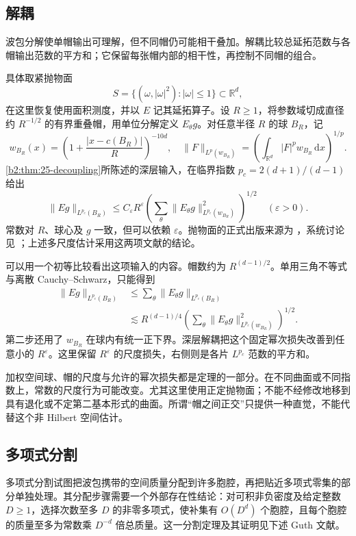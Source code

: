 \subsection{解耦}
\label{b2:subsec:230604}

波包分解使单帽输出可理解，但不同帽仍可能相干叠加。解耦比较总延拓范数与各帽输出范数的平方和；它保留每张帽内部的相干性，再控制不同帽的组合。

具体取紧抛物面
\[
 S=\{(\omega,|\omega|^2):|\omega|\leq1\}\subset\mathbb R^d,
\]
在这里恢复使用面积测度，并以 \(E\) 记其延拓算子。设 \(R\geq1\)，将参数域切成直径约 \(R^{-1/2}\) 的有界重叠帽，用单位分解定义 \(E_\theta g\)。对任意半径 \(R\) 的球 \(B_R\)，记
\[
 w_{B_R}(x)=\left(1+\frac{|x-c(B_R)|}{R}\right)^{-10d},\quad
 \|F\|_{L^p(w_{B_R})}
 =\left(\int_{\mathbb R^d}|F|^p w_{B_R}\,\mathrm dx\right)^{1/p}.
\]
\cref{b2:thm:25-decoupling}所陈述的深层输入，在临界指数 \(p_c=2(d+1)/(d-1)\) 给出
\[
 \|Eg\|_{L^{p_c}(B_R)}
 \leq C_\varepsilon R^\varepsilon
       \left(\sum_\theta
          \|E_\theta g\|_{L^{p_c}(w_{B_R})}^2
       \right)^{1/2}
 \quad(\varepsilon>0).
\]
常数对 \(R\)、球心及 \(g\) 一致，但可以依赖 \(\varepsilon\)。抛物面的正式出版来源为 \cite{BourgainDemeter2015Proof}，系统讨论见 \cite{Demeter2020Fourier}；上述多尺度估计采用这两项文献的结论。

\ProseParagraphBreak
可以用一个初等比较看出这项输入的内容。帽数约为 \(R^{(d-1)/2}\)。单用三角不等式与离散 Cauchy--Schwarz，只能得到
\[
 \begin{aligned}
 \|Eg\|_{L^{p_c}(B_R)}
 &\leq\sum_\theta\|E_\theta g\|_{L^{p_c}(B_R)}\\
 &\lesssim R^{(d-1)/4}
   \left(\sum_\theta
      \|E_\theta g\|_{L^{p_c}(w_{B_R})}^2
   \right)^{1/2}.
 \end{aligned}
\]
第二步还用了 \(w_{B_R}\) 在球内有统一正下界。深层解耦把这个固定幂次损失改善到任意小的 \(R^\varepsilon\)。这里保留 \(R^\varepsilon\) 的尺度损失，右侧则是各片 \(L^{p_c}\) 范数的平方和。

加权空间球、帽的尺度与允许的幂次损失都是定理的一部分。在不同曲面或不同指数上，常数的尺度行为可能改变。尤其这里使用正定抛物面；不能不经修改地移到具有退化或不定第二基本形式的曲面。所谓“帽之间正交”只提供一种直觉，不能代替这个非 Hilbert 空间估计。

\subsection{多项式分割}
\label{b2:subsec:230605}

多项式分割试图把波包携带的空间质量分配到许多胞腔，再把贴近多项式零集的部分单独处理。其分配步骤需要一个外部存在性结论：对可积非负密度及给定整数 \(D\geq1\)，选择次数至多 \(D\) 的非零多项式，使补集有 \(O(D^d)\) 个胞腔，且每个胞腔的质量至多为常数乘 \(D^{-d}\) 倍总质量。这一分割定理及其证明见下述 Guth 文献。

